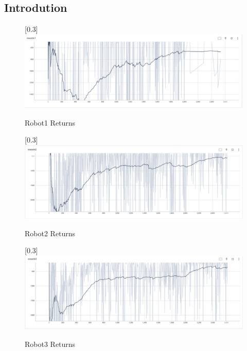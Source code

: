 \documentclass[12pt]{extarticle}
\begin{document}
\subsection{Introdution}
\begin{figure}[H]  
\begin{center}
\scalebox{0.3}[0.3]{
\includegraphics{robot1}
}

\caption[Robot1 Returns]{Robot1 Returns}
\label{fig:return1}
\end{center}

\end{figure}
\begin{figure}[H]  
\begin{center}
\scalebox{0.3}[0.3]{
\includegraphics{robot2}
}

\caption[Robot2 Returns]{Robot2 Returns}
\label{fig:return2}
\end{center}

\end{figure}




\begin{figure}[H]  
\begin{center}
\scalebox{0.3}[0.3]{
\includegraphics{robot3}
}
\end{center}
\caption[Robot3 Returns]{Robot3 Returns}
\label{fig:return3}

\end{figure}
\end{document}
